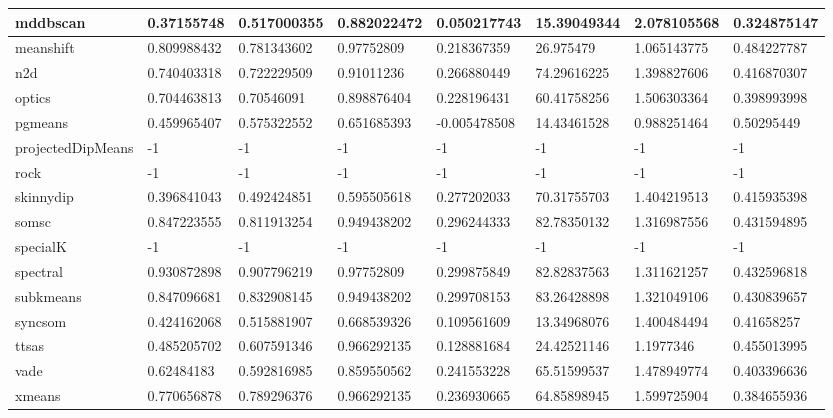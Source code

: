 \begin{table}[H]
\begin{tabular}{|l|l|l|l|l|l|l|l|}
\hline
mddbscan & 0.37155748 & 0.517000355 & 0.882022472 & 0.050217743 & 15.39049344 & 2.078105568 & 0.324875147 \\
\hline
meanshift & 0.809988432 & 0.781343602 & 0.97752809 & 0.218367359 & 26.975479 & 1.065143775 & 0.484227787 \\
\hline
n2d & 0.740403318 & 0.722229509 & 0.91011236 & 0.266880449 & 74.29616225 & 1.398827606 & 0.416870307 \\
\hline
optics & 0.704463813 & 0.70546091 & 0.898876404 & 0.228196431 & 60.41758256 & 1.506303364 & 0.398993998 \\
\hline
pgmeans & 0.459965407 & 0.575322552 & 0.651685393 & -0.005478508 & 14.43461528 & 0.988251464 & 0.50295449 \\
\hline
projectedDipMeans & -1 & -1 & -1 & -1 & -1 & -1 & -1 \\
\hline
rock & -1 & -1 & -1 & -1 & -1 & -1 & -1 \\
\hline
skinnydip & 0.396841043 & 0.492424851 & 0.595505618 & 0.277202033 & 70.31755703 & 1.404219513 & 0.415935398 \\
\hline
somsc & 0.847223555 & 0.811913254 & 0.949438202 & 0.296244333 & 82.78350132 & 1.316987556 & 0.431594895 \\
\hline
specialK & -1 & -1 & -1 & -1 & -1 & -1 & -1 \\
\hline
spectral & 0.930872898 & 0.907796219 & 0.97752809 & 0.299875849 & 82.82837563 & 1.311621257 & 0.432596818 \\
\hline
subkmeans & 0.847096681 & 0.832908145 & 0.949438202 & 0.299708153 & 83.26428898 & 1.321049106 & 0.430839657 \\
\hline
syncsom & 0.424162068 & 0.515881907 & 0.668539326 & 0.109561609 & 13.34968076 & 1.400484494 & 0.41658257 \\
\hline
ttsas & 0.485205702 & 0.607591346 & 0.966292135 & 0.128881684 & 24.42521146 & 1.1977346 & 0.455013995 \\
\hline
vade & 0.62484183 & 0.592816985 & 0.859550562 & 0.241553228 & 65.51599537 & 1.478949774 & 0.403396636 \\
\hline
xmeans & 0.770656878 & 0.789296376 & 0.966292135 & 0.236930665 & 64.85898945 & 1.599725904 & 0.384655936 \\
\hline
\end{tabular}
\end{table}